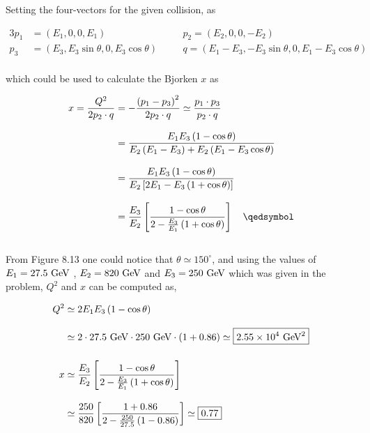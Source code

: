 \begin{solution}
Setting the four-vectors for the given collision, as 

    \begin{alignat*}{3}
        p_1 &= \left( E_1,0,0,E_1 \right) \quad &&p_2 = \left( E_2,0,0,-E_2 \right) \\[0.12in]
        p_3 &= \left( E_3, E_3\sin\theta,0,E_3\cos\theta \right) \quad &&q = \left( E_1-E_3, - E_3\sin\theta, 0, E_1 - E_3\cos\theta  \right)
    \end{alignat*}\\
    which could be used to calculate the Bjorken $x$ as

    \begin{align*}
        x = \frac{Q^2}{2p_2\cdot q} &= -\frac{\left( p_1-p_3 \right)^2}{2p_2\cdot q} \simeq  \frac{p_1 \cdot p_3}{p_2\cdot q} \\[0.12in]
        &= \frac{E_1E_3\left( 1-\cos\theta \right)}{E_2 \left( E_1-E_3 \right)+E_2\left( E_1-E_3\cos\theta \right)} \\[0.12in]
        &= \frac{E_1E_3\left( 1-\cos\theta \right)}{E_2 \left[ 2 E_1-E_3 \left(  1+ \cos\theta  \right)\right]} \\[0.12in]
        &= \frac{E_3}{E_2} \left[ \frac{1-\cos\theta}{2-\frac{E_3}{E_1}\left(1+\cos\theta\right)} \right] \qed
    \end{align*}\\
From Figure 8.13 one could notice that $\theta \simeq 150^\circ$, and using the values of $E_1 = 27.5\text{ GeV}$ , $E_2=820\text{ GeV}$ and $E_3 = 250\text{ GeV}$ which was given in the problem, $Q^2$ and $x$ can be computed as,

    \begin{align*}
        Q^2 &\simeq 2E_1 E_3 \left( 1-\cos\theta \right) \\[0.12in]
        &\simeq 2 \cdot 27.5 \text{ GeV} \cdot 250\text{ GeV} \cdot \left( 1+ 0.86 \right) \simeq\boxed{ \num{2.55e+4} \text{ GeV}^2} \\[0.175in]
        x &\simeq  \frac{E_3}{E_2} \left[ \frac{1-\cos\theta}{2-\frac{E_3}{E_1}\left(1+\cos\theta\right)} \right] \\[0.12in]
        &\simeq \frac{250}{820} \left[  \frac{1+0.86}{2-\frac{250}{27.5}\left( 1-0.86 \right)}  \right] \simeq \boxed{0.77}
    \end{align*}\\
\end{solution}

